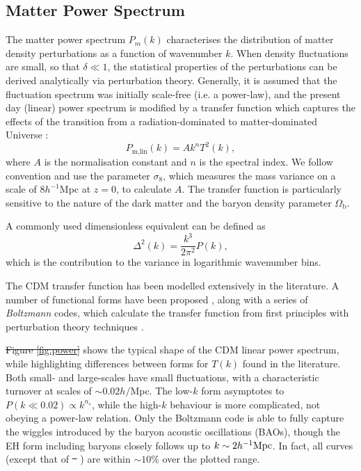 \documentclass[5p,aas_macros]{elsarticle}
\providecommand{\DIFaddtex}[1]{{\protect\color{blue}\uwave{#1}}} %
\providecommand{\DIFdeltex}[1]{{\protect\color{red}\sout{#1}}}                      %
\providecommand{\DIFaddbegin}{} %
\providecommand{\DIFaddend}{} %
\providecommand{\DIFdelbegin}{} %
\providecommand{\DIFdelend}{} %
\providecommand{\DIFadd}[1]{\texorpdfstring{\DIFaddtex{#1}}{#1}} %
\providecommand{\DIFdel}[1]{\texorpdfstring{\DIFdeltex{#1}}{}} %
\begin{document}
\subsection{Matter Power Spectrum}
\label{sec:powerspec}
The matter power spectrum \DIFdelbegin \DIFdel{$P_m(k)$ }\DIFdelend \DIFaddbegin \DIFadd{$P_{\rm m}(k)$ }\DIFaddend characterises the distribution of matter 
density perturbations as a function of wavenumber $k$.
When density fluctuations are small, so that $\delta \ll 1$, the statistical properties of the perturbations can be derived analytically via perturbation theory. 
Generally, it is assumed that the fluctuation spectrum was initially scale-free (i.e. a power-law), and the present day (linear) power spectrum is modified by a transfer function which captures the effects of the transition from a radiation-dominated to matter-dominated Universe \citep{Bond1984}:
\begin{equation}
	\label{eq:powerfromtransfer}
	P_\text{m,lin}(k) = Ak^n T^2(k),
\end{equation}
where $A$ is the normalisation constant and $n$ is the spectral index. 
We follow convention and use the
parameter $\sigma_8$, which measures the mass variance on a scale of $8 h^{-1}$Mpc at $z=0$, 
to calculate $A$. The transfer function is particularly sensitive to the nature of
the dark matter and the baryon density parameter $\Omega_\text{b}$.

A commonly used dimensionless equivalent can be defined as 
\begin{equation}
    \Delta^2(k) = \frac{k^3}{2\pi^2} P(k),
\end{equation}
which is the contribution to the variance in logarithmic wavenumber bins.

The CDM transfer function has been modelled extensively in the literature. 
A number of functional forms have been proposed \citep[][hereafter EH]{Bond1984,Bardeen1986,Eisenstein1998}, along with a series of \textit{Boltzmann} codes, which calculate the transfer function from first principles with perturbation theory techniques \citep{Zaldarriaga2000,Lewis2000,Blas2011}. 

\DIFdelbegin \DIFdel{Figure \ref{fig:power} }\DIFdelend \DIFaddbegin \DIFadd{\mbox{%
\cref{fig:power} }\hspace{0pt}%
}\DIFaddend shows the typical shape of the CDM linear power spectrum, while highlighting differences between forms for $T(k)$ found in the literature. Both small- and large-scales have small fluctuations, with a characteristic turnover at scales of $\sim 0.02h/$Mpc. The low-$k$ form asymptotes to $P(k \ll 0.02 ) \propto k^{n_s}$, while the high-$k$ behaviour is more complicated, not obeying a power-law relation. Only the Boltzmann code is able to fully capture the wiggles introduced by the baryon acoustic oscillations (BAOs), though the EH form including baryons closely follows up to $k \sim 2 h^{-1}{\rm Mpc}$. 
In fact, all curves (except that of \DIFdelbegin \DIFdel{\mbox{%
\citet{Bond1984}}\hspace{0pt}%
}\DIFdelend \DIFaddbegin \DIFadd{\mbox{%
\citealt{Bond1984}}\hspace{0pt}%
}\DIFaddend ) are within $\sim 10\%$ over the plotted range.
\end{document}
